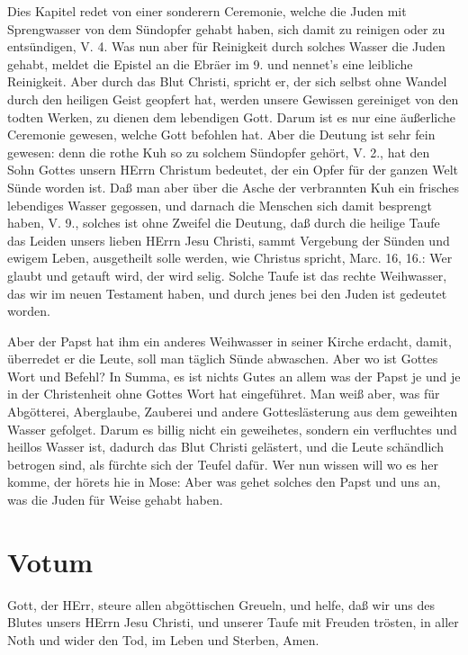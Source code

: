 Dies Kapitel redet von einer sonderern Ceremonie, welche die Juden mit Sprengwasser von dem Sündopfer gehabt haben, sich damit zu reinigen oder zu entsündigen, V. 4. Was nun aber für Reinigkeit durch solches Wasser die
Juden gehabt, meldet die Epistel an die Ebräer im 9. und nennet's eine leibliche Reinigkeit. Aber durch das Blut Christi, spricht er, der sich selbst ohne Wandel durch den heiligen Geist geopfert hat, werden unsere Gewissen gereiniget von den todten Werken, zu dienen dem lebendigen Gott. Darum ist es nur eine äußerliche Ceremonie gewesen, welche Gott befohlen hat. Aber die Deutung ist sehr fein gewesen: denn die rothe Kuh so zu solchem Sündopfer gehört, V. 2., hat den Sohn Gottes unsern HErrn Christum bedeutet, der ein Opfer für der ganzen Welt Sünde worden ist. Daß man aber über die Asche der verbrannten Kuh ein frisches lebendiges Wasser gegossen, und darnach die Menschen sich damit besprengt haben, V. 9., solches ist ohne Zweifel die Deutung, daß durch die heilige Taufe das Leiden unsers lieben HErrn Jesu Christi, sammt Vergebung der Sünden und ewigem Leben, ausgetheilt solle werden, wie Christus spricht, Marc. 16, 16.: Wer glaubt und getauft wird, der wird selig. Solche Taufe ist das rechte Weihwasser, das wir im neuen Testament haben, und durch jenes bei den Juden ist gedeutet worden.

Aber der Papst hat ihm ein anderes Weihwasser in seiner Kirche erdacht, damit, überredet er die Leute, soll man täglich Sünde abwaschen. Aber wo ist Gottes Wort und Befehl? In Summa, es ist nichts Gutes an allem was der Papst je und je in der Christenheit ohne Gottes Wort hat eingeführet. Man weiß aber, was für Abgötterei, Aberglaube, Zauberei und andere Gotteslästerung aus dem geweihten Wasser gefolget. Darum es billig nicht ein geweihetes, sondern ein verfluchtes und heillos Wasser ist, dadurch das Blut Christi gelästert, und die Leute schändlich betrogen sind, als fürchte sich der Teufel dafür. Wer nun wissen will wo es her komme, der hörets hie in Mose: Aber was gehet solches den Papst und uns an, was die Juden für Weise gehabt haben.

\section{Votum}

Gott, der HErr, steure allen abgöttischen Greueln, und helfe, daß wir uns des Blutes unsers HErrn Jesu Christi, und unserer Taufe mit Freuden trösten, in aller Noth und wider den Tod, im Leben und Sterben, Amen.

